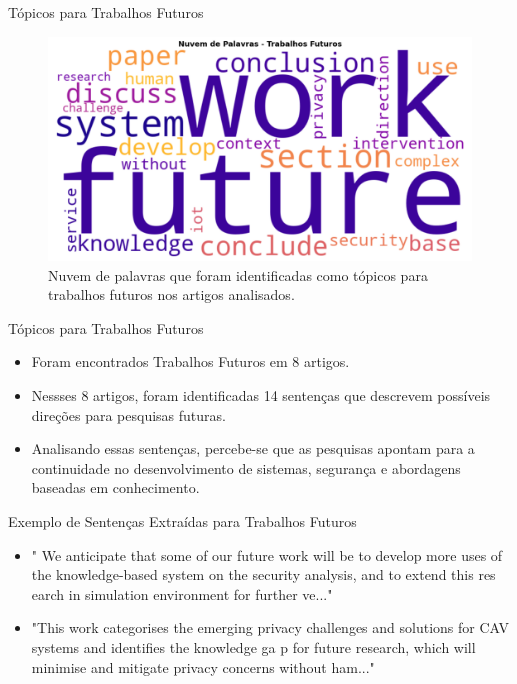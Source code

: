 \documentclass{beamer}
\begin{document}
\begin{frame}{Tópicos para Trabalhos Futuros}
    \begin{figure}
        \centering
        \includegraphics[width=\textwidth]{img/tabalho-futuro.png}
        \caption{Nuvem de palavras que foram identificadas como tópicos para trabalhos futuros nos artigos analisados.}
    \end{figure}
\end{frame}

\begin{frame}{Tópicos para Trabalhos Futuros}
    \begin{itemize}
        \item Foram encontrados Trabalhos Futuros em 8 artigos.
        \item Nessses 8 artigos, foram identificadas 14 sentenças que descrevem possíveis direções para pesquisas futuras.
        \item Analisando essas sentenças, percebe-se que as pesquisas apontam para a continuidade no desenvolvimento de sistemas, segurança e abordagens baseadas em conhecimento.
    \end{itemize}    
\end{frame}

\begin{frame}{Exemplo de Sentenças Extraídas para Trabalhos Futuros}
    \begin{itemize}
        \item " We anticipate that some of our future  work will be  to develop more uses of the knowledge-based  system on the security analysis, and to extend this res earch in simulation environment for further ve..."
        \item "This work categorises the emerging privacy challenges and solutions for CAV systems and identifies the knowledge ga p for future research, which will minimise and mitigate privacy concerns without ham..."
    \end{itemize}
    
\end{frame}
\end{document}
